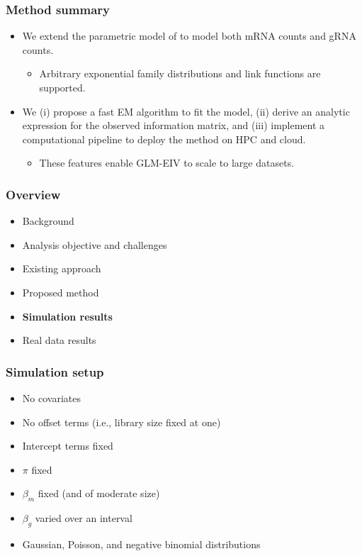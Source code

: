 \documentclass{beamer}
\begin{document}
\begin{frame}
\frametitle{Method summary}
\begin{itemize}
\item We extend the parametric model of \cite{Sarkar2021} to model both mRNA counts and gRNA counts.
\begin{itemize}
\item Arbitrary exponential family distributions and link functions are supported. 
\end{itemize}
\item We (i) propose a fast EM algorithm to fit the model, (ii) derive an analytic expression for the observed information matrix, and (iii) implement a computational pipeline to deploy the method on HPC and cloud. 
\begin{itemize}
\item These features enable GLM-EIV to scale to large datasets.
\end{itemize}
\end{itemize}
\end{frame}

\begin{frame}
\frametitle{Overview}
\begin{itemize}
\item Background
\item Analysis objective and challenges
\item Existing approach
\item Proposed method
\item \textbf{Simulation results}
\item Real data results
\end{itemize}
\end{frame}

\begin{frame}
\frametitle{Simulation setup}
\begin{itemize}
\item No covariates
\item No offset terms (i.e., library size fixed at one)
\item Intercept terms fixed
\item $\pi$ fixed
\item $\beta_m$ fixed (and of moderate size)
\item $\beta_g$ varied over an interval
\item Gaussian, Poisson, and negative binomial distributions
\end{itemize}
\end{frame}
\end{document}
